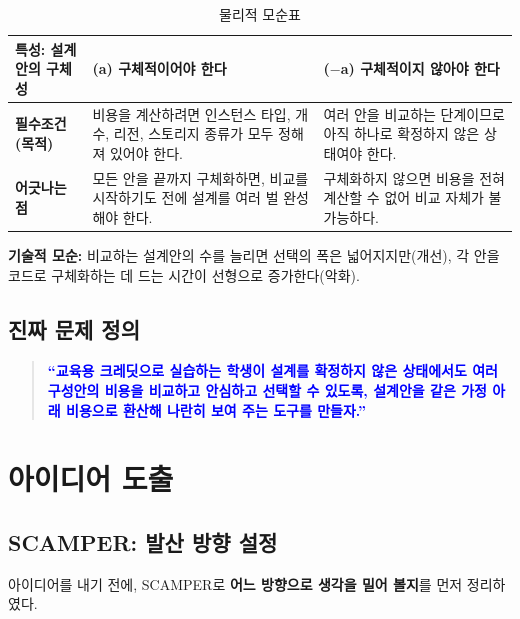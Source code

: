 \documentclass[10pt,a4paper]{article}
\begin{document}
\begin{table}[!h]
\centering
\caption{물리적 모순표}
\label{tab:contradiction}
\footnotesize
\begin{tabularx}{\textwidth}{l Y Y}
\toprule
\textbf{특성: 설계안의 구체성} & \textbf{(a) 구체적이어야 한다} & \textbf{($-$a) 구체적이지 않아야 한다} \\
\midrule
\textbf{필수조건(목적)} & 비용을 계산하려면 인스턴스 타입, 개수, 리전, 스토리지 종류가 모두 정해져 있어야 한다. & 여러 안을 비교하는 단계이므로 아직 하나로 확정하지 않은 상태여야 한다. \\
\textbf{어긋나는 점} & 모든 안을 끝까지 구체화하면, 비교를 시작하기도 전에 설계를 여러 벌 완성해야 한다. & 구체화하지 않으면 비용을 전혀 계산할 수 없어 비교 자체가 불가능하다. \\
\bottomrule
\end{tabularx}
\end{table}

\textbf{기술적 모순:} 비교하는 설계안의 수를 늘리면 선택의 폭은 넓어지지만(개선), 각 안을 코드로 구체화하는 데 드는 시간이 선형으로 증가한다(악화).

\subsection{진짜 문제 정의}

\begin{quote}
\textcolor{blue}{\textbf{``교육용 크레딧으로 실습하는 학생이 설계를 확정하지 않은 상태에서도 여러 구성안의 비용을 비교하고 안심하고 선택할 수 있도록, 설계안을 같은 가정 아래 비용으로 환산해 나란히 보여 주는 도구를 만들자.''}}
\end{quote}

\section{아이디어 도출}

\subsection{SCAMPER: 발산 방향 설정}

아이디어를 내기 전에, SCAMPER로 \textbf{어느 방향으로 생각을 밀어 볼지}를 먼저 정리하였다.
\end{document}
